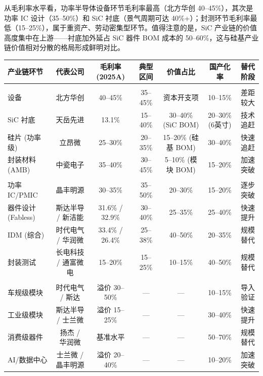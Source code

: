 从毛利率水平看，功率半导体设备环节毛利率最高（北方华创 40--45\%），其次是功率 IC 设计（35--50\%）和 SiC 衬底（景气周期可达 40\%+）；封测环节毛利率最低（15--25\%），属于重资产、劳动密集型环节。值得注意的是，SiC 产业链的价值高度集中在上游——衬底加外延占 SiC 器件 BOM 成本的 50--60\%，这与硅基产业链价值相对分散的格局形成鲜明对比。

\begin{exhibitbox}[表 2-3：功率半导体各环节价值分配与国产替代进度]
\centering
\small
\begin{tabular}{@{}lcccccc@{}}
\toprule
\textbf{产业链环节} & \textbf{代表公司} & \textbf{毛利率 (2025A)} & \textbf{典型区间} & \textbf{价值占比} & \textbf{国产化率} & \textbf{替代阶段} \\
\midrule
\rowcolor{navy!5}
\multicolumn{6}{l}{\textit{上游：材料与设备}} \\
设备 & 北方华创 & 40--45\% & 35--45\% & 资本开支项 & 10--15\% & 差距较大 \\
SiC 衬底 & 天岳先进 & 13.1\% & 15--40\% & 30--40\% (SiC BOM) & 20--30\% (6英寸) & 技术追赶 \\
硅片 (功率级) & 立昂微 & 25--30\% & 20--35\% & 15--20\% (硅基 BOM) & 30--40\% & 快速追赶 \\
封装材料 (AMB) & 中瓷电子 & 35--40\% & 30--45\% & 5--10\% (模块 BOM) & 15--20\% & 加速突破 \\
\midrule
\rowcolor{accentblue!5}
\multicolumn{6}{l}{\textit{中游：设计与制造}} \\
功率 IC/PMIC & 晶丰明源 & 30--35\% & 35--50\% & 20--30\% & 15--20\% & 逐步突破 \\
器件设计 (Fabless) & 斯达半导 / 新洁能 & 31.6\% / 32.9\% & 30--40\% & 25--35\% & 25--40\% & 快速提升 \\
IDM (综合) & 时代电气 / 华润微 & 33.4\% / 26.4\% & 25--38\% & 40--50\% & 20--35\% & 规模替代 \\
封装测试 & 长电科技 / 通富微电 & 15--20\% & 15--25\% & 10--15\% & 40--50\% & 规模替代 \\
\midrule
\rowcolor{riskgreen!5}
\multicolumn{6}{l}{\textit{下游应用端 (产品溢价)}} \\
车规级模块 & 时代电气 / 斯达 & 溢价 30--50\% & — & — & 10--15\% & 导入验证 \\
工业级模块 & 斯达半导 / 士兰微 & 溢价 15--25\% & — & — & 30--40\% & 快速提升 \\
消费级器件 & 扬杰 / 华润微 & 基准水平 & — & — & 50--70\% & 规模替代 \\
AI/数据中心 & 士兰微 / 晶丰明源 & 溢价 20--40\% & — & — & 10--20\% & 加速突破 \\
\bottomrule
\end{tabular}
\vspace{0.2cm}
\end{exhibitbox}

